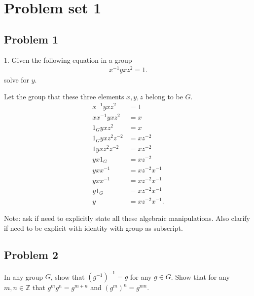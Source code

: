 \section{Problem set 1}      

\subsection{Problem 1}
1. Given the following equation in a group 
\begin{align*}
  x^{-1}yxz^{2} = 1
.\end{align*}
solve for \( y \).

\begin{solution}

  Let the group that these three elements \( x,y,z \) belong to be \( G \).
 \begin{align*}
  x^{-1} y x z^{2} &= 1 \\
  x x^{-1} y x z^{2} &= x   \\
  1_{G} y x z^{2} &= x   \\
  1_{G} y x z^{2} z^{-2} &= x z^{-2}   \\
  1 y x z^{2} z^{-2} &= x z^{-2}   \\
  y x 1_{G} &= x z^{-2}   \\
  y x x^{-1} &= x z^{-2} x^{-1}   \\
  y x x^{-1} &= x z^{-2} x^{-1}   \\
  y 1_{G} &= x z^{-2} x^{-1}   \\
  y &= x z^{-2} x^{-1} 
.\end{align*}
\end{solution}

Note: ask if need to explicitly state all these algebraic manipulations.
Also clarify if need to be explicit with identity with group as subscript.

\subsection{Problem 2}
In any group \( G \), show that \( (g^{-1})^{-1}  = g\) for any \( g \in G \). Show that 
for any \( m,n \in \mathbb{Z} \) that \( g^{m} g^{n} = g^{m + n} \) and \( (g^{m})^{n} = g^{mn} \).

